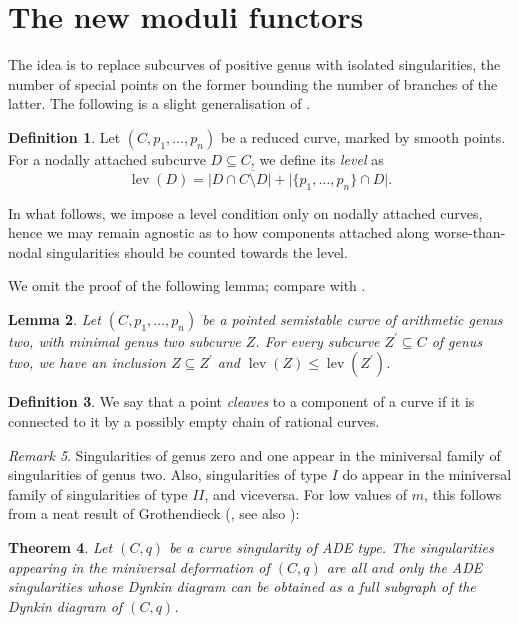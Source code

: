 \documentclass{compositio}
\newcommand{\lev}{\operatorname{lev}}
\theoremstyle{plain}
\newtheorem{thm}{Theorem}[section]
\newtheorem{lem}[thm]{Lemma}
\theoremstyle{definition}
\newtheorem{definition}[thm]{Definition}
\theoremstyle{remark}
\newtheorem{rem}[thm]{Remark}
\begin{document}
\section{The new moduli functors}\label{sec:stability}
The idea is to replace subcurves of positive genus with isolated singularities, the number of special points on the former bounding the number of branches of the latter. The following is a slight generalisation of \cite[Definition 3.4]{SMY1}.
\begin{definition}
 Let $(C,p_1,\ldots,p_n)$ be a reduced curve, marked by smooth points. For a nodally attached subcurve $D\subseteq C$, we define its \emph{level} as \[ \lev(D)=\lvert D\cap\overline{C\setminus D}\rvert+\lvert\{p_1,\ldots,p_n\}\cap D\rvert.\]
\end{definition}
In what follows, we impose a level condition only on nodally attached curves, hence we may remain agnostic as to how components attached along worse-than-nodal singularities should be counted towards the level.

We omit the proof of the following lemma; compare with \cite[Corollary 3.2, Lemma 3.5]{SMY1}.
\begin{lem}
 Let $(C,p_1,\ldots,p_n)$ be a pointed \emph{semistable} curve of arithmetic genus two, with minimal genus two subcurve $Z$. For every subcurve $Z^\prime\subseteq C$ of genus two, we have an inclusion $Z\subseteq Z^\prime$ and $\lev(Z)\leq\lev(Z^\prime)$.
\end{lem}

\begin{definition}
We say that a point \emph{cleaves} to a component of a curve if it is connected to it by a possibly empty chain of rational curves. 
\end{definition}


\begin{rem}
 Singularities of genus zero and one appear in the miniversal family of singularities of genus two. Also, singularities of type $I$ do appear in the miniversal family of singularities of type $I\!I$, and viceversa. For low values of $m$, this follows from a neat result of Grothendieck (\cite[p. 2277]{C-ML}, see also \cite{Arnold,Demazure}):
 \begin{thm}\label{thm:ADE}
  Let $(C,q)$ be a curve singularity of ADE type. The singularities appearing in the miniversal deformation of $(C,q)$ are all and only the ADE singularities whose Dynkin diagram can be obtained as a full subgraph of the Dynkin diagram of $(C,q)$.
 \end{thm}
\end{rem}
\end{document}
